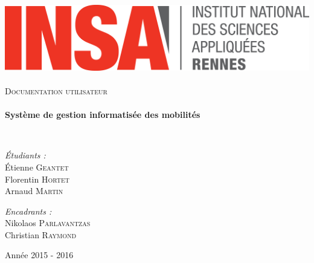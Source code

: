 \begin{titlepage}
        \begin{sffamily}
            \begin{center}

                \includegraphics[width=400pt]{logo_INSA.png}~\\[2.5cm]

                \textsc{\huge Documentation utilisateur}\\[2.5cm]

                \HRule \\[0.4cm]
                { \huge \bfseries Système de gestion informatisée des mobilités\\[0.4cm] }

                \HRule \\[4cm]

                \begin{minipage}{0.4\textwidth}
                    \begin{flushleft} \large
                        \emph{Étudiants :}\\
                        Étienne \textsc{Geantet}\\
                        Florentin \textsc{Hortet}\\
                        Arnaud \textsc{Martin}\\
                    \end{flushleft}
                \end{minipage}
                \begin{minipage}{0.5\textwidth}
                    \begin{flushright} \large
                        \emph{Encadrants :} \\
                        Nikolaos \textsc{Parlavantzas}\\
                        Christian \textsc{Raymond}
                    \end{flushright}
                \end{minipage}

                \vfill

                {\large Année 2015 - 2016}

            \end{center}
        \end{sffamily}
    \end{titlepage}
